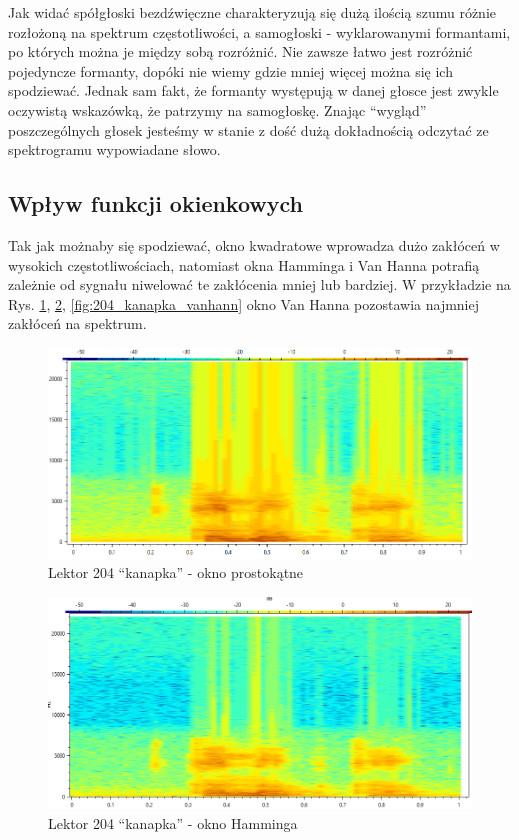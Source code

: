 \documentclass[12pt,a4paper]{article}
\begin{document}
        Jak widać spółgłoski bezdźwięczne charakteryzują się dużą ilością szumu różnie rozłożoną na spektrum częstotliwości, a samogłoski - wyklarowanymi formantami, po których można je między sobą rozróżnić. Nie zawsze łatwo jest rozróżnić pojedyncze formanty, dopóki nie wiemy gdzie mniej więcej można się ich spodziewać. Jednak sam fakt, że formanty występują w danej głosce jest zwykle oczywistą wskazówką, że patrzymy na samogłoskę. Znając ``wygląd'' poszczególnych głosek jesteśmy w stanie z dość dużą dokładnością odczytać ze spektrogramu wypowiadane słowo. \cite{russel}


    \subsection{Wpływ funkcji okienkowych}
        Tak jak możnaby się spodziewać, okno kwadratowe wprowadza dużo zakłóceń w wysokich częstotliwościach, natomiast okna Hamminga i Van Hanna potrafią zależnie od sygnału niwelować te zakłócenia mniej lub bardziej. W przykładzie na Rys. \ref{fig:204_kanapka_rect}, \ref{fig:204_kanapka_hamming}, \ref{fig:204_kanapka_vanhann} okno Van Hanna pozostawia najmniej zakłóceń na spektrum.

        \begin{figure}[h!]
            \centering
            \includegraphics[width=1.0\textwidth]{figures/204_kanapka_rect.png}
            \caption{Lektor 204 ``kanapka'' - okno prostokątne}
            \label{fig:204_kanapka_rect}
        \end{figure}

        \begin{figure}[h!]
            \centering
            \includegraphics[width=1.0\textwidth]{figures/204_kanapka_hamming.png}
            \caption{Lektor 204 ``kanapka'' - okno Hamminga}
            \label{fig:204_kanapka_hamming}
        \end{figure}
\end{document}
